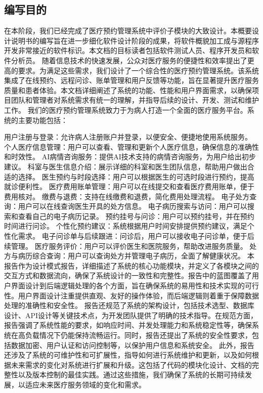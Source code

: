 \subsection{编写目的}
在本阶段，我们已经完成了医疗预约管理系统中评价子模块的大致设计。本概要设计说明书的编写旨在进一步细化软件设计阶段的成果，将软件概貌加工成与源程序开发非常接近的软件标识。本文档的目标读者包括软件测试人员、程序开发员和软件分析员。
随着信息技术的快速发展，公众对医疗服务的便捷性和效率提出了更高的要求。为满足这些需求，我们设计了一个综合性的医疗预约管理系统。该系统集成了在线预约、远程问诊、账单管理和用户反馈等功能，旨在显著提升医疗服务质量和患者体验。本文档详细阐述了系统的功能、性能和用户界面需求，以确保项目团队和管理者对系统需求有统一的理解，并指导后续的设计、开发、测试和维护工作。
我们的医疗预约管理系统致力于为病人打造一个全面的医疗服务平台。系统的主要功能包括：

用户注册与登录：允许病人注册账户并登录，以便安全、便捷地使用系统服务。
个人医疗信息管理：用户可以查看、管理和更新个人医疗信息，确保信息的准确性和时效性。
AI病情咨询服务：提供AI技术支持的病情咨询服务，为用户给出初步建议。
科室与医生信息介绍：展示详细的科室和医生团队信息，帮助用户做出合适的选择。
医生预约与时段选择：用户可以根据医生的可选时段进行预约，提高就诊便利性。
医疗费用账单管理：用户可以在线提交和查看医疗费用账单，便于费用核对。
缴费与退费：支持在线缴费和退费，简化费用处理流程。
电子处方查询：用户可以在线查询医生开具的处方信息。
电子病历搜索与访问：用户可以搜索和查看自己的电子病历记录。
预约挂号与问诊：用户可以预约挂号，并在预约时间进行问诊。
个性化预约建议：系统根据用户时间安排提供预约建议，满足个性化需求。
电子问诊单与后续跟进：问诊后，用户可以接收电子问诊单，便于后续管理。
医疗服务评价：用户可以评价医生和医院服务，帮助改进服务质量。
处方与病历综合查询：用户可以查询处方并管理电子病历，全面了解健康状况。 本报告作为设计模式报告，详细描述了系统的核心功能模块，并定义了各模块之间的交互方式和数据流向，确保了系统设计的一致性和完整性。报告中的蓝图覆盖了用户界面设计到后端逻辑处理的各个方面，旨在确保系统的易用性和技术实现的可行性。用户界面设计注重提供直观、友好的操作体验，而后端逻辑则着重于保障数据处理的准确性和安全性。 报告还规范了系统的架构设计，包括技术选型、数据库设计、API设计等关键技术点，为开发团队提供了明确的技术指导。在规范方面，报告强调了系统性能的要求，如响应时间、并发处理能力和系统稳定性等，确保系统在高负载情况下仍能保持流畅运行。同时，报告还提出了系统的安全性要求，包括数据加密、用户认证和访问控制等，以保护用户信息和系统安全。 此外，报告还涉及了系统的可维护性和可扩展性，指导如何进行系统维护和更新，以及如何根据未来需求的变化对系统进行扩展和升级。这包括了代码的模块化设计、文档的完整性以及版本控制的最佳实践。通过这些措施，我们确保了系统的长期可持续发展，以适应未来医疗服务领域的变化和需求。

